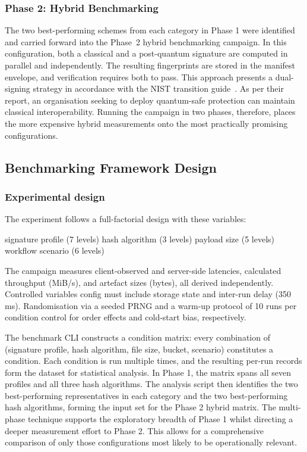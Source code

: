 \documentclass[12pt,a4paper]{article}
\begin{document}
\subsubsection{Phase 2: Hybrid Benchmarking}

The two best-performing schemes from each category in Phase 1 were identified and carried forward into the Phase~2 hybrid benchmarking campaign. In this configuration, both a classical and a post-quantum signature are computed in parallel and independently. The resulting fingerprints are stored in the manifest envelope, and verification requires both to pass. This approach presents a dual-signing strategy in accordance with the NIST transition guide~\cite{nist-ir8547-2024}. As per their report, an organisation seeking to deploy quantum-safe protection can maintain classical interoperability. Running the campaign in two phases, therefore, places the more expensive hybrid measurements onto the most practically promising configurations.

\subsection{Benchmarking Framework Design}

\subsubsection{Experimental design} 
The experiment follows a full-factorial design with these variables: 

signature profile (7 levels)
hash algorithm (3 levels)
payload size (5 levels)
workflow scenario (6 levels)

The campaign measures client-observed and server-side latencies, calculated throughput (MiB/s), and artefact sizes (bytes), all derived independently. Controlled variables config must include storage state and inter-run delay (350 ms). Randomisation via a seeded PRNG and a warm-up protocol of 10 runs per condition control for order effects and cold-start bias, respectively.

The benchmark CLI constructs a condition matrix: every combination of (signature profile, hash algorithm, file size, bucket, scenario) constitutes a condition. Each condition is run multiple times, and the resulting per-run records form the dataset for statistical analysis. In Phase 1, the matrix spans all seven profiles and all three hash algorithms. The analysis script then identifies the two best-performing representatives in each category and the two best-performing hash algorithms, forming the input set for the Phase 2 hybrid matrix. The multi-phase technique supports the exploratory breadth of Phase 1 whilst directing a deeper measurement effort to Phase 2. This allows for a comprehensive comparison of only those configurations most likely to be operationally relevant.
\end{document}
